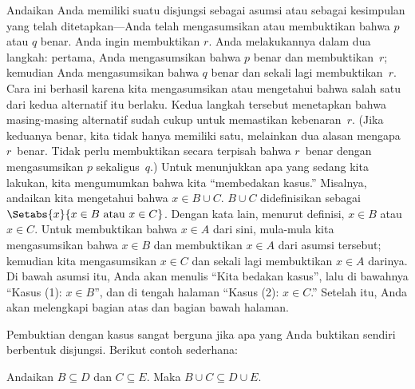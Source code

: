 \documentclass[../../../include/open-logic-section]{subfiles}
\begin{document}
Andaikan Anda memiliki suatu disjungsi sebagai asumsi atau sebagai
kesimpulan yang telah ditetapkan---Anda telah mengasumsikan atau
membuktikan bahwa $p$ atau $q$ benar. Anda ingin membuktikan $r$. Anda
melakukannya dalam dua langkah: pertama, Anda mengasumsikan bahwa $p$
benar dan membuktikan~$r$; kemudian Anda mengasumsikan bahwa $q$ benar
dan sekali lagi membuktikan~$r$. Cara ini berhasil karena kita
mengasumsikan atau mengetahui bahwa salah satu dari kedua alternatif
itu berlaku. Kedua langkah tersebut menetapkan bahwa masing-masing
alternatif sudah cukup untuk memastikan kebenaran~$r$. (Jika keduanya
benar, kita tidak hanya memiliki satu, melainkan dua alasan mengapa
$r$~benar. Tidak perlu membuktikan secara terpisah bahwa $r$~benar
dengan mengasumsikan $p$ sekaligus~$q$.) Untuk menunjukkan apa yang
sedang kita lakukan, kita mengumumkan bahwa kita ``membedakan kasus.''
Misalnya, andaikan kita mengetahui bahwa $x \in B \cup C$. $B \cup C$
didefinisikan sebagai $\Setabs{x}{x \in B \text{ atau } x \in C}$.
Dengan kata lain, menurut definisi, $x \in B$ atau $x \in C$. Untuk
membuktikan bahwa $x \in A$ dari sini, mula-mula kita mengasumsikan
bahwa $x \in B$ dan membuktikan $x \in A$ dari asumsi tersebut;
kemudian kita mengasumsikan $x \in C$ dan sekali lagi membuktikan $x
\in A$ darinya. Di bawah asumsi itu, Anda akan menulis ``Kita bedakan
kasus'', lalu di bawahnya ``Kasus (1): $x \in B$'', dan di tengah
halaman ``Kasus (2): $x \in C$.'' Setelah itu, Anda akan melengkapi
bagian atas dan bagian bawah halaman.

Pembuktian dengan kasus sangat berguna jika apa yang Anda buktikan
sendiri berbentuk disjungsi. Berikut contoh sederhana:

\begin{prop}
Andaikan $B \subseteq D$ dan $C \subseteq E$. Maka $B \cup C \subseteq
D \cup E$.
\end{prop}
\end{document}
